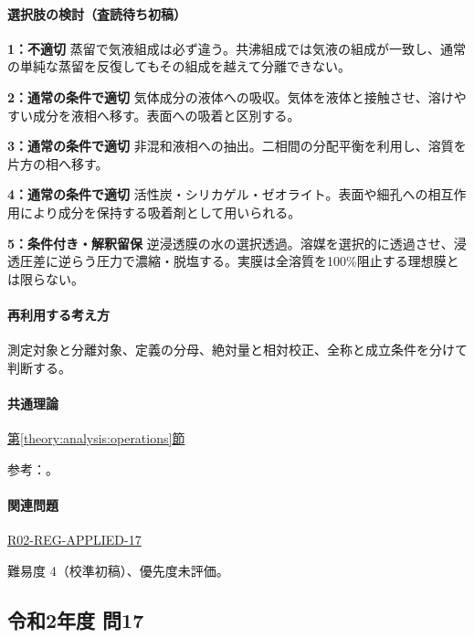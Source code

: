 \paragraph{選択肢の検討（査読待ち初稿）}\mbox{}\par

\noindent\textbf{1：不適切} 蒸留で気液組成は必ず違う。共沸組成では気液の組成が一致し、通常の単純な蒸留を反復してもその組成を越えて分離できない。\par

\noindent\textbf{2：通常の条件で適切} 気体成分の液体への吸収。気体を液体と接触させ、溶けやすい成分を液相へ移す。表面への吸着と区別する。\par

\noindent\textbf{3：通常の条件で適切} 非混和液相への抽出。二相間の分配平衡を利用し、溶質を片方の相へ移す。\par

\noindent\textbf{4：通常の条件で適切} 活性炭・シリカゲル・ゼオライト。表面や細孔への相互作用により成分を保持する吸着剤として用いられる。\par

\noindent\textbf{5：条件付き・解釈留保} 逆浸透膜の水の選択透過。溶媒を選択的に透過させ、浸透圧差に逆らう圧力で濃縮・脱塩する。実膜は全溶質を100\%阻止する理想膜とは限らない。\par

\paragraph{再利用する考え方} 測定対象と分離対象、定義の分母、絶対量と相対校正、全称と成立条件を分けて判断する。

\paragraph{共通理論} \hyperref[theory:analysis:operations]{第\ref*{theory:analysis:operations}節}

\par 参考：\cite{nptel_azeotrope,inorganic_zeolite}。

\paragraph{関連問題} \hyperref[q:r02-reg-applied-17]{R02-REG-APPLIED-17}

\par 難易度 4（校準初稿）、優先度未評価。

\subsection{令和2年度 問17}
\label{q:r02-reg-applied-17}

